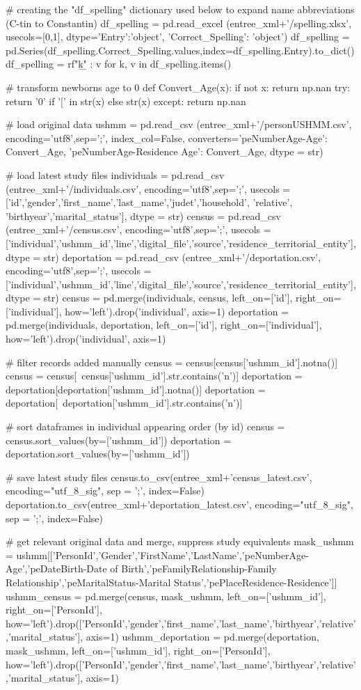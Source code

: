 \documentclass[a4paper,12pt,twoside]{book}
\begin{document}
\begin{python}
# creating the "df_spelling" dictionary used below to expand name abbreviations (C-tin to Constantin)
df_spelling = pd.read_excel (entree_xml+'/spelling.xlsx', usecols=[0,1], dtype={'Entry':'object', 'Correct_Spelling': 'object'})
df_spelling = pd.Series(df_spelling.Correct_Spelling.values,index=df_spelling.Entry).to_dict()
df_spelling = {rf"\b{k}\b" : v for k, v in df_spelling.items()}

# transform newborns age to 0
def Convert_Age(x):
  if not x:
    return np.nan
  try:
    return '0' if '[' in str(x) else str(x)   
  except:        
    return np.nan

# load original data
ushmm = pd.read_csv (entree_xml+'/personUSHMM.csv', encoding='utf8',sep=';', index_col=False, converters={'peNumberAge-Age': Convert_Age, 'peNumberAge-Residence Age': Convert_Age}, dtype = str)

# load latest study files
individuals = pd.read_csv (entree_xml+'/individuals.csv', encoding='utf8',sep=';', usecols = ['id','gender','first_name','last_name','judet','household', 'relative', 'birthyear','marital_status'],  dtype = str)
census = pd.read_csv (entree_xml+'/census.csv', encoding='utf8',sep=';', usecols = ['individual','ushmm_id','line','digital_file','source','residence_territorial_entity'],  dtype = str)
deportation = pd.read_csv (entree_xml+'/deportation.csv', encoding='utf8',sep=';', usecols = ['individual','ushmm_id','line','digital_file','source','residence_territorial_entity'], dtype = str)
census = pd.merge(individuals, census, left_on=['id'], right_on=['individual'], how='left').drop('individual', axis=1)
deportation = pd.merge(individuals, deportation, left_on=['id'], right_on=['individual'], how='left').drop('individual', axis=1)

# filter records added manually
census = census[census['ushmm_id'].notna()]
census = census[~census['ushmm_id'].str.contains('n')]
deportation = deportation[deportation['ushmm_id'].notna()]
deportation = deportation[~deportation['ushmm_id'].str.contains('n')]

# sort dataframes in individual appearing order (by id)
census = census.sort_values(by=['ushmm_id'])
deportation = deportation.sort_values(by=['ushmm_id'])

# save latest study files
census.to_csv(entree_xml+'census_latest.csv', encoding="utf_8_sig", sep = ';', index=False)
deportation.to_csv(entree_xml+'deportation_latest.csv', encoding="utf_8_sig", sep = ';', index=False)

# get relevant original data and merge, suppress study equivalents
mask_ushmm = ushmm[['PersonId','Gender','FirstName','LastName','peNumberAge-Age','peDateBirth-Date of Birth','peFamilyRelationship-Family Relationship','peMaritalStatus-Marital Status','pePlaceResidence-Residence']]
ushmm_census = pd.merge(census, mask_ushmm, left_on=['ushmm_id'], right_on=['PersonId'], how='left').drop(['PersonId','gender','first_name','last_name','birthyear','relative','marital_status'], axis=1)
ushmm_deportation = pd.merge(deportation, mask_ushmm, left_on=['ushmm_id'], right_on=['PersonId'], how='left').drop(['PersonId','gender','first_name','last_name','birthyear','relative','marital_status'], axis=1)


\end{python}
\end{document}
